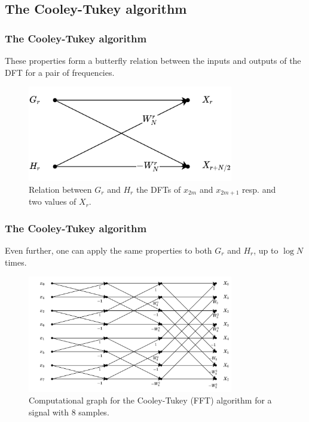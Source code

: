 \documentclass{beamer}
\begin{document}
\subsection{The Cooley-Tukey algorithm}
\begin{frame}
    \frametitle{The Cooley-Tukey algorithm}
    These properties form a butterfly relation between the inputs and outputs of the DFT for a pair of frequencies.
    \begin{figure}
        \centering
        \includegraphics[width=0.8\textwidth]{cooleytukey_butterfly.png}
	\caption{Relation between $G_r$ and $H_r$ the DFTs of $x_{2m}$ and $x_{2m+1}$ resp. and two values of $X_r$.}
        \label{fig:cooleytukey_butterfly-png}
    \end{figure}
\end{frame}

\begin{frame}
    \frametitle{The Cooley-Tukey algorithm}
    Even further, one can apply the same properties to both $G_r$ and $H_r$, up to $\log N$ times.
    \begin{figure}
        \centering
        \includegraphics[width=0.8\textwidth]{cooleytukey_8example.png}
	\caption{Computational graph for the Cooley-Tukey (FFT) algorithm for a signal with 8 samples.}
        \label{fig:cooleytukey_8example-png}
    \end{figure}
\end{frame}
\end{document}
